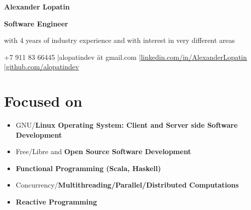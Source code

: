\begin{center}
\fontsize{18pt}{10pt}\selectfont
\bfseries Alexander Lopatin\mdseries

\vspace{5pt}

\fontsize{14pt}{10pt}\selectfont
\bfseries Software Engineer\mdseries

\fontsize{12pt}{10pt}\selectfont
with 4 years of industry experience and with interest in very different areas

\horizline

+7 911 83 66445
|alopatindev ät gmail.com
|\href{https://www.linkedin.com/in/AlexanderLopatin}{linkedin.com/in/AlexanderLopatin}
|\href{https://github.com/alopatindev?tab=repositories}{github.com/alopatindev}

\end{center}

\fontsize{11pt}{12pt}\selectfont

\section*{Focused on}

\begin{itemize}
\item GNU/\bfseries Linux \mdseries Operating System: \bfseries Client \mdseries and Server side Software Development
\item Free/Libre and \bfseries Open Source \mdseries Software Development
\item \bfseries Functional \mdseries Programming (Scala, Haskell)
\item Concurrency/\bfseries Multithreading\mdseries/Parallel/\bfseries Distributed \mdseries Computations
\item \bfseries Reactive \mdseries Programming
\end{itemize}

